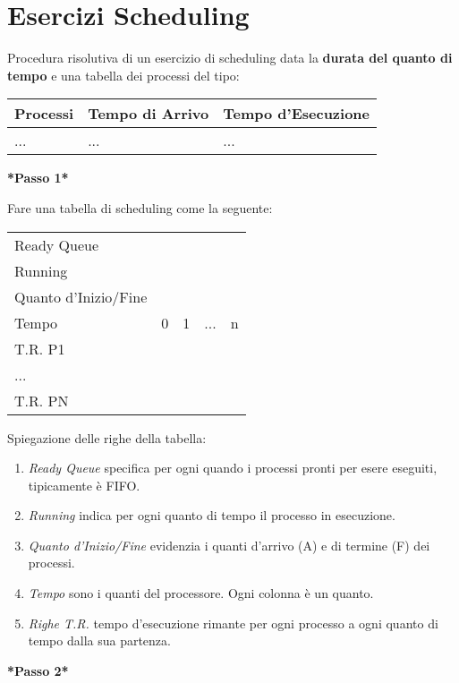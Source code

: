 \section{Esercizi Scheduling}
Procedura risolutiva di un esercizio di scheduling data la \textbf{durata del quanto di tempo} e una tabella dei processi del tipo:


\begin{center}
	\begin{tabular}{lll}
		Processi & Tempo di Arrivo & Tempo d'Esecuzione \\
		\hline
		... & ... & ...
	\end{tabular}
\end{center}

\textbf{*Passo 1*}

Fare una  tabella di scheduling come la seguente:

\begin{center}
	\begin{tabular}{l|llll}
		Ready Queue & & & & \\
		Running & & & & \\
		Quanto d'Inizio/Fine & & & & \\
		\hline
		Tempo & 0 & 1 & ... & n \\
		\hline
		T.R. P1 & & & & \\
		... & & & & \\
		T.R. PN & & & & \\
	\end{tabular}
\end{center}

Spiegazione delle righe della tabella:
\begin{enumerate}
	\item \textit{Ready Queue} specifica per ogni quando i processi pronti per esere eseguiti, tipicamente è FIFO.
	\item \textit{Running} indica per ogni quanto di tempo il processo in esecuzione.
	\item \textit{Quanto d'Inizio/Fine} evidenzia i quanti d'arrivo (A) e di termine (F) dei processi.
	\item \textit{Tempo} sono i quanti del processore. Ogni colonna è un quanto.
	\item \textit{Righe T.R.} tempo d'esecuzione rimante per ogni processo a ogni quanto di tempo dalla sua partenza.
\end{enumerate}

\textbf{*Passo 2*}

